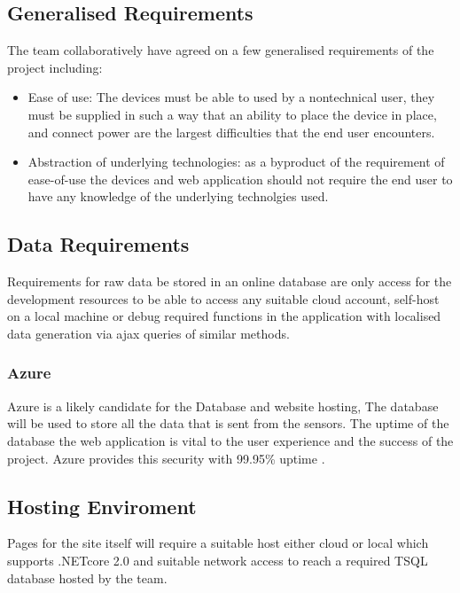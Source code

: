 \documentclass{article}
\begin{document}
        \subsection{Generalised Requirements}
            The team collaboratively have agreed on a few generalised requirements of the project
            including:
            \begin{itemize}
                \item Ease of use: The devices must be able to used by a nontechnical user, they must
                be supplied in such a way that an ability to place the device in place, and connect power
                are the largest difficulties that the end user encounters.
                \item Abstraction of underlying technologies: as a byproduct of the requirement of ease-of-use
                the devices and web application should not require the end user to have any knowledge of the 
                underlying technolgies used.
            \end{itemize}
        \subsection{Data Requirements}
            Requirements for raw data be stored in an online database are only access
            for the development resources to be able to access any suitable cloud account, 
            self-host on a local machine or debug required functions in the application with 
            localised data generation via ajax\cite{AJAX} queries of similar methods.
            
            \subsubsection{Azure}
                Azure is a likely candidate for the Database and website hosting, The database will be used to store 
                all the data that is sent from the sensors. The uptime of the database the web application is vital 
                to the user experience and the success of the project. Azure provides this security 
                with 99.95\% uptime \cite{AzureUptime}.

        \subsection{Hosting Enviroment}
            Pages for the site itself will require a suitable host either cloud or local which
            supports .NETcore 2.0\cite{DotNetCore2} and suitable network access to reach a
            required TSQL\cite{TSQL} database hosted by the team.
        
\end{document}
